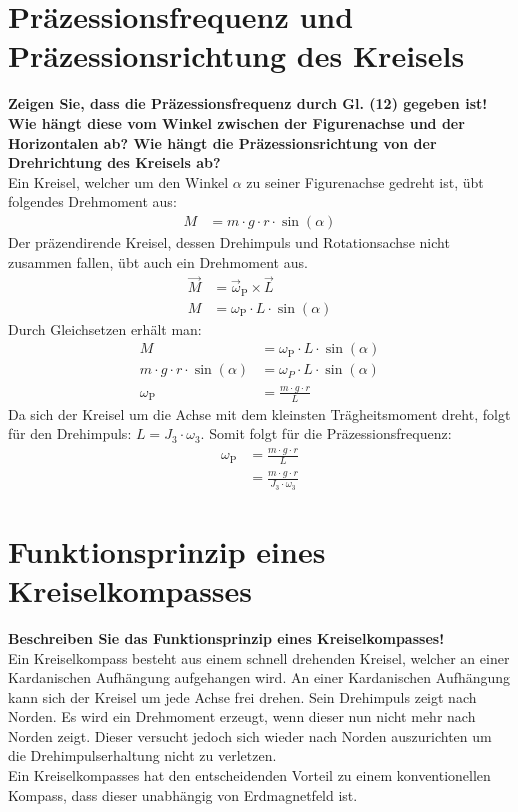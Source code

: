 \section{Präzessionsfrequenz und Präzessionsrichtung des Kreisels}\label{sec:Praezession}
\textbf{Zeigen Sie, dass die Präzessionsfrequenz durch Gl. (12) gegeben ist! Wie hängt diese vom Winkel zwischen der Figurenachse und der Horizontalen ab? Wie hängt die Präzessionsrichtung von der Drehrichtung des Kreisels ab?}\\
Ein Kreisel, welcher um den Winkel $\alpha$ zu seiner Figurenachse gedreht ist,
übt folgendes Drehmoment aus:
\begin{align}
    M&=m\cdot g\cdot r\cdot\sin(\alpha)
\end{align}
Der präzendirende Kreisel, dessen Drehimpuls und Rotationsachse nicht zusammen fallen, übt auch ein Drehmoment aus.
\begin{align}
    \vec{M}&=\vec{\omega}_\text{P}\times\vec{L}\\
    M&=\omega_\text{P}\cdot L \cdot\sin(\alpha)
\end{align}
Durch Gleichsetzen erhält man:
\begin{align}
    M&=\omega_\text{P}\cdot L \cdot\sin(\alpha)\\
    m\cdot g\cdot r\cdot\sin(\alpha)&=\omega_P\cdot L \cdot\sin(\alpha)\\
    \omega_\text{P}&=\frac{m\cdot g\cdot r}{L}
\end{align}
Da sich der Kreisel um die Achse mit dem kleinsten Trägheitsmoment dreht, folgt für den Drehimpuls: \(L=J_3\cdot\omega_3\).
Somit folgt für die Präzessionsfrequenz:
\begin{align}
    \omega_\text{P}&=\frac{m\cdot g\cdot r}{L}\\
    &=\frac{m\cdot g\cdot r}{J_3\cdot\omega_3}
\end{align}
\section{Funktionsprinzip eines Kreiselkompasses}
\textbf{Beschreiben Sie das Funktionsprinzip eines Kreiselkompasses!}\\
Ein Kreiselkompass besteht aus einem schnell drehenden Kreisel,
welcher an einer Kardanischen Aufhängung aufgehangen wird.
An einer Kardanischen Aufhängung kann sich der Kreisel um jede Achse frei drehen.
Sein Drehimpuls zeigt nach Norden.
Es wird ein Drehmoment erzeugt, wenn dieser nun nicht mehr nach Norden zeigt.
Dieser versucht jedoch sich wieder nach Norden auszurichten um die Drehimpulserhaltung nicht zu verletzen.\\
Ein Kreiselkompasses hat den entscheidenden Vorteil zu einem konventionellen Kompass, dass dieser unabhängig von Erdmagnetfeld ist.
